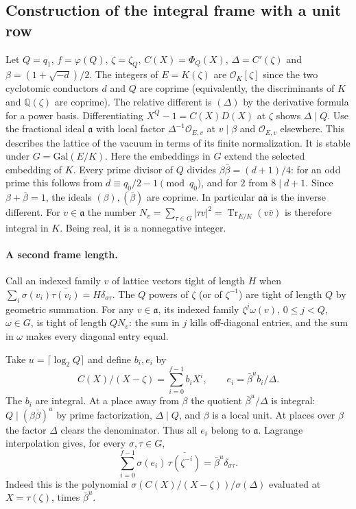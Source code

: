 \subsection{Construction of the integral frame with a unit row}
\label{sec:unitrow-frame}

Let $Q=q_1$, $f=\varphi(Q)$, $\zeta=\zeta_Q$,
$C(X)=\Phi_Q(X)$, $\Delta=C'(\zeta)$ and
$\beta=(1+\sqrt{-d})/2$. The integers of $E=K(\zeta)$
are $\mathcal O_K[\zeta]$ since the two cyclotomic conductors
$d$ and $Q$ are coprime (equivalently, the discriminants of
$K$ and $\mathbb Q(\zeta)$ are coprime). The relative different
is $(\Delta)$ by the derivative formula for a power basis.
Differentiating $X^Q-1=C(X)D(X)$ at $\zeta$ shows $\Delta\mid Q$.
Use the fractional ideal $\mathfrak a$ with local factor
$\Delta^{-1}\mathcal O_{E,v}$ at $v\mid\beta$ and
$\mathcal O_{E,v}$ elsewhere. This describes the lattice of the vacuum
in terms of its finite normalization. It is stable under $G=\mathrm{Gal}(E/K)$.
Here the embeddings in $G$ extend the selected embedding of $K$.
Every prime divisor of $Q$ divides $\beta\bar\beta=(d+1)/4$:
for an odd prime this follows from $d\equiv q_0/2-1\pmod{q_0}$,
and for $2$ from $8\mid d+1$. Since $\beta+\bar\beta=1$,
the ideals $(\beta),(\bar\beta)$ are coprime.
In particular $\mathfrak a\bar{\mathfrak a}$ is the inverse different.
For $v\in\mathfrak a$ the number
$N_v=\sum_{\tau\in G}|\tau v|^2=\operatorname{Tr}_{E/K}(v\bar v)$
is therefore integral in $K$. Being real, it is a nonnegative integer.

\paragraph{A second frame length.}
Call an indexed family $v$ of lattice vectors tight of length $H$ when
$\sum_i\sigma(v_i)\overline{\tau(v_i)}=H\delta_{\sigma\tau}$.
The $Q$ powers of $\zeta$ (or of $\zeta^{-1}$) are tight of
length $Q$ by geometric summation. For any $v\in\mathfrak a$, its
indexed family $\zeta^j\omega(v)$, $0\le j<Q$, $\omega\in G$,
is tight of length $QN_v$: the sum in $j$ kills off-diagonal
entries, and the sum in $\omega$ makes every diagonal entry equal.

Take $u=\lceil\log_2 Q\rceil$ and define $b_i,e_i$ by
\[
 C(X)/(X-\zeta)=\sum_{i=0}^{f-1} b_i X^i,\qquad
 e_i=\bar\beta^u b_i/\Delta .
\]
The $b_i$ are integral. At a place away from $\beta$ the quotient
$\bar\beta^u/\Delta$ is integral: $Q\mid(\beta\bar\beta)^u$
by prime factorization, $\Delta\mid Q$, and $\beta$ is a local unit.
At places over $\beta$ the factor $\Delta$ clears the denominator.
Thus all $e_i$ belong to $\mathfrak a$.
Lagrange interpolation gives, for every $\sigma,\tau\in G$,
\[
 \sum_{i=0}^{f-1}\sigma(e_i)\,\overline{\tau(\zeta^{-i})}
   =\bar\beta^u\delta_{\sigma\tau}.
\]
Indeed this is the polynomial $\sigma(C(X)/(X-\zeta))/\sigma(\Delta)$
evaluated at $X=\tau(\zeta)$, times $\bar\beta^u$.

